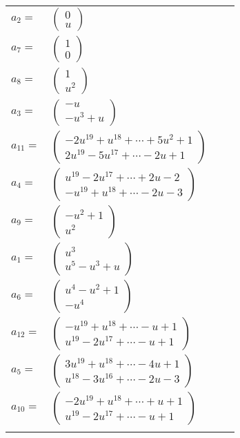 \documentclass[1p]{elsarticle_modified}
\theoremstyle{definition}
\begin{document}
\begin{tabular}{m{7pt} m{180pt} m{7pt} m{180pt} }
\flushright $a_{2}=$&$\begin{pmatrix}0\\u\end{pmatrix}$ \\
\flushright $a_{7}=$&$\begin{pmatrix}1\\0\end{pmatrix}$ \\
\flushright $a_{8}=$&$\begin{pmatrix}1\\u^2\end{pmatrix}$ \\
\flushright $a_{3}=$&$\begin{pmatrix}- u\\- u^3+u\end{pmatrix}$ \\
\flushright $a_{11}=$&$\begin{pmatrix}-2 u^{19}+u^{18}+\cdots+5 u^2+1\\2 u^{19}-5 u^{17}+\cdots-2 u+1\end{pmatrix}$ \\
\flushright $a_{4}=$&$\begin{pmatrix}u^{19}-2 u^{17}+\cdots+2 u-2\\- u^{19}+u^{18}+\cdots-2 u-3\end{pmatrix}$ \\
\flushright $a_{9}=$&$\begin{pmatrix}- u^2+1\\u^2\end{pmatrix}$ \\
\flushright $a_{1}=$&$\begin{pmatrix}u^3\\u^5- u^3+u\end{pmatrix}$ \\
\flushright $a_{6}=$&$\begin{pmatrix}u^4- u^2+1\\- u^4\end{pmatrix}$ \\
\flushright $a_{12}=$&$\begin{pmatrix}- u^{19}+u^{18}+\cdots- u+1\\u^{19}-2 u^{17}+\cdots- u+1\end{pmatrix}$ \\
\flushright $a_{5}=$&$\begin{pmatrix}3 u^{19}+u^{18}+\cdots-4 u+1\\u^{18}-3 u^{16}+\cdots-2 u-3\end{pmatrix}$ \\
\flushright $a_{10}=$&$\begin{pmatrix}-2 u^{19}+u^{18}+\cdots+u+1\\u^{19}-2 u^{17}+\cdots- u+1\end{pmatrix}$\\&\end{tabular}
\end{document}
